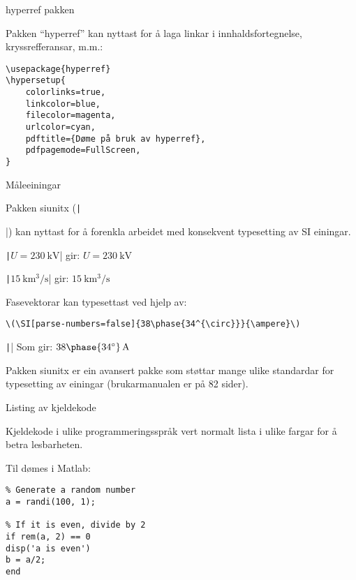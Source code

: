 	\begin{frame}[containsverbatim]{hyperref pakken}
	
	Pakken ``hyperref'' kan nyttast for å laga linkar i innhaldsfortegnelse, kryssrefferansar, m.m.:
	
	\begin{verbatim}
\usepackage{hyperref}
\hypersetup{
	colorlinks=true,
	linkcolor=blue,
	filecolor=magenta,      
	urlcolor=cyan,
	pdftitle={Døme på bruk av hyperref},
	pdfpagemode=FullScreen,
}
	\end{verbatim}

\end{frame}





\begin{frame}[containsverbatim]{Måleeiningar}
	
	Pakken siunitx (\texttt|\usepackage{siunitx}|) kan nyttast for å forenkla arbeidet med konsekvent typesetting av SI einingar.
	
	\texttt|\(U = \SI{230}{\kilo\volt}\)| gir: \(U = \SI{230}{\kilo\volt}\)
	
	\texttt|\(\SI{15}{\kilo\meter\cubed\per\second}\)| gir: \(\SI{15}{\kilo\meter\cubed\per\second}\)
	
	Fasevektorar kan typesettast ved hjelp av:
	\begin{verbatim}
\(\SI[parse-numbers=false]{38\phase{34^{\circ}}}{\ampere}\)
	\end{verbatim}
	\texttt||
	Som gir: \( \SI[parse-numbers=false]{38\phase{34^{\circ}}}{\ampere}\)

        Pakken siunitx er ein avansert pakke som støttar mange ulike standardar for typesetting av einingar (brukarmanualen er på 82 sider).
        
\end{frame}




\begin{frame}[containsverbatim]{Listing av kjeldekode}
	
	Kjeldekode i ulike programmeringsspråk vert normalt lista i ulike fargar for å betra lesbarheten.
	
	Til dømes i Matlab:
	
	\begin{verbatim}
% Generate a random number
a = randi(100, 1);

% If it is even, divide by 2
if rem(a, 2) == 0
disp('a is even')
b = a/2;
end
	\end{verbatim}
	
\end{frame}





